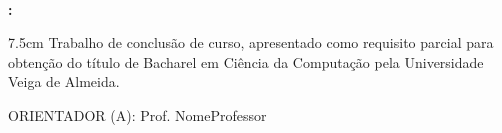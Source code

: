 
\begin{center}

    \thispagestyle{pretext}
    \ \\



    \vfill

    \begin{Large}
        \textbf{\uppercase\expandafter{\TitleName}:} \\
        \textbf{\uppercase\expandafter{\SubtitleName}}
    \end{Large}

\end{center}

\vspace{3em}

\begin{adjustwidth}{7.5cm}{}
    \noindent Trabalho de conclusão de curso, apresentado como requisito parcial para obtenção do título de Bacharel em Ciência da Computação pela Universidade Veiga de Almeida.
\end{adjustwidth}

\vspace{2cm}

ORIENTADOR (A): Prof. NomeProfessor

\vfill

\begin{center}
    \begin{large}
        \printCity \\
        \the \year
    \end{large}
\end{center}

\newpage
